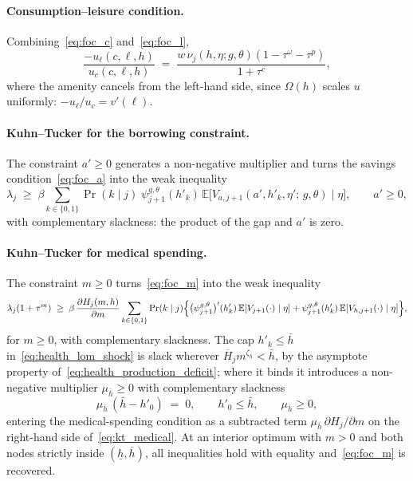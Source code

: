 \documentclass[12pt,a4paper]{article}
\newcommand{\E}{\mathbb{E}}
\begin{document}
\begin{appendices}
\paragraph{Consumption--leisure condition.} Combining~\eqref{eq:foc_c} and~\eqref{eq:foc_l},
\begin{equation}
\label{eq:cons_leisure}
\frac{-u_\ell(c, \ell, h)}{u_c(c, \ell, h)}
\;=\;
\frac{w\, \nu_j(h, \eta; g, \theta)(1-\tau^\omega-\tau^p)}{1 + \tau^c},
\end{equation}
where the amenity cancels from the left-hand side, since $\Omega(h)$ scales $u$ uniformly: $-u_\ell/u_c = v'(\ell)$.

\paragraph{Kuhn--Tucker for the borrowing constraint.}
The constraint $a' \geq 0$ generates a non-negative multiplier and turns the savings condition~\eqref{eq:foc_a} into the weak inequality
\begin{equation}
\label{eq:kt_borrowing}
\lambda_j \;\geq\; \beta \sum_{k \in \{0,1\}} \Pr(k \mid j)\; \psi_{j+1}^{g,\theta}(h'_k)\, \E\bigl[V_{a, j+1}(a', h'_k, \eta';\, g, \theta) \mid \eta\bigr], \qquad a' \geq 0,
\end{equation}
with complementary slackness: the product of the gap and $a'$ is zero.

\paragraph{Kuhn--Tucker for medical spending.}
The constraint $m \geq 0$ turns~\eqref{eq:foc_m} into the weak inequality
\begin{equation}
\label{eq:kt_medical}
\lambda_j (1 + \tau^m)
\;\geq\;
\beta\, \frac{\partial H_j(m,h)}{\partial m} \sum_{k \in \{0,1\}} \Pr(k \mid j)\Bigl\{
\bigl(\psi_{j+1}^{g,\theta}\bigr)'(h'_k)\, \E[V_{j+1}(\cdot) \mid \eta]
+ \psi_{j+1}^{g,\theta}(h'_k)\, \E[V_{h, j+1}(\cdot) \mid \eta]
\Bigr\},
\end{equation}
for $m \geq 0$, with complementary slackness. The cap $h'_k \leq \bar h$ in~\eqref{eq:health_lom_shock} is slack wherever $\overline{H}_j m^{\zeta_h} < \bar h$, by the asymptote property of~\eqref{eq:health_production_deficit}; where it binds it introduces a non-negative multiplier $\mu_{\bar h} \geq 0$ with complementary slackness
\begin{equation}
\label{eq:kt_healthcap}
\mu_{\bar h}\,(\bar h - h'_0) \;=\; 0, \qquad h'_0 \leq \bar h, \qquad \mu_{\bar h} \geq 0,
\end{equation}
entering the medical-spending condition as a subtracted term $\mu_{\bar h}\, \partial H_j/\partial m$ on the right-hand side of~\eqref{eq:kt_medical}. At an interior optimum with $m > 0$ and both nodes strictly inside $(\underline h, \bar h)$, all inequalities hold with equality and~\eqref{eq:foc_m} is recovered.


\end{appendices}
\end{document}
